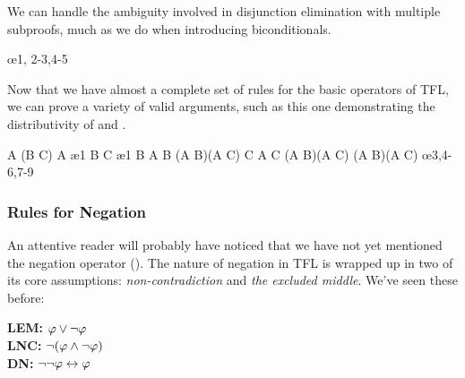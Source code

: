 We can handle the ambiguity involved in disjunction elimination with multiple
subproofs, much as we do when introducing biconditionals.

\begin{fitchrule}
  \label{def:eor-elimination-rule}
  \leavevmode
  \vspace{-0.9\baselineskip}
  \begin{fitchproof}
     {\ephi\eor\epsi}
    \open
     {\ephi}  
     {\echi}
    \close
    \open
     {\epsi}  
     {\echi}
    \close
     {\echi}  \oe{1, 2-3,4-5}
  \end{fitchproof}
\end{fitchrule}

Now that we have almost a complete set of rules for the basic operators of TFL,
we can prove a variety of valid arguments, such as this one demonstrating the
distributivity of \sand and \eor.

\begin{fitchproof}
   {A \eand (B \eor C)}          
   {A}                           \ae{1}
   {B \eor C}                    \ae{1}
  \open
   {B}                           
   {A \eand B}                   
   {(A \eand B)\eor(A \eand C)}  
    \close
  \open
   {C}                           
   {A \eand C}                   
   {(A \eand B)\eor(A \eand C)}  
  \close
   {(A \eand B)\eor(A \eand C)} \oe{3,4-6,7-9}
\end{fitchproof}

\subsubsection{Rules for Negation}

An attentive reader will probably have noticed that we have not yet mentioned
the negation operator (\enot). The nature of negation in TFL is wrapped up in
two of its core assumptions: \emph{non-contradiction} and \emph{the excluded
middle}. We've seen these before:

\begin{center}
    \textbf{LEM:} $\varphi\vee\neg\varphi$         \\
    \textbf{LNC:} $\neg(\varphi\wedge\neg\varphi)$ \\
    \textbf{DN:} $\neg\neg\varphi\leftrightarrow\varphi$    \\
\end{center}

